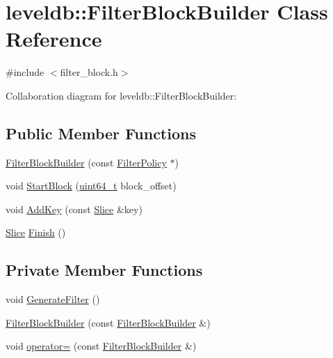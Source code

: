 \hypertarget{classleveldb_1_1_filter_block_builder}{\section{leveldb\-:\-:Filter\-Block\-Builder Class Reference}
\label{classleveldb_1_1_filter_block_builder}
}


{\ttfamily \#include $<$filter\-\_\-block.\-h$>$}



Collaboration diagram for leveldb\-:\-:Filter\-Block\-Builder\-:
\subsection*{Public Member Functions}
\begin{DoxyCompactItemize}
\item 
\hyperlink{classleveldb_1_1_filter_block_builder_a8e8b5ae95df5a13c035bec85e22549ca}{Filter\-Block\-Builder} (const \hyperlink{classleveldb_1_1_filter_policy}{Filter\-Policy} $\ast$)
\item 
void \hyperlink{classleveldb_1_1_filter_block_builder_a766a753a200f7386196a68897e47c1c3}{Start\-Block} (\hyperlink{stdint_8h_aaa5d1cd013383c889537491c3cfd9aad}{uint64\-\_\-t} block\-\_\-offset)
\item 
void \hyperlink{classleveldb_1_1_filter_block_builder_a4fd9db735c5c72973cec62e4fd98137d}{Add\-Key} (const \hyperlink{classleveldb_1_1_slice}{Slice} \&key)
\item 
\hyperlink{classleveldb_1_1_slice}{Slice} \hyperlink{classleveldb_1_1_filter_block_builder_a75fa127d8af42e749abdd235eed97cad}{Finish} ()
\end{DoxyCompactItemize}
\subsection*{Private Member Functions}
\begin{DoxyCompactItemize}
\item 
void \hyperlink{classleveldb_1_1_filter_block_builder_ab9141e1d64c8dc779a5fc9eae390407a}{Generate\-Filter} ()
\item 
\hyperlink{classleveldb_1_1_filter_block_builder_a5f999cf28b5cc91c8a79f64b40a7ff1a}{Filter\-Block\-Builder} (const \hyperlink{classleveldb_1_1_filter_block_builder}{Filter\-Block\-Builder} \&)
\item 
void \hyperlink{classleveldb_1_1_filter_block_builder_a14f852d72d7ebde56e0827f619ce796d}{operator=} (const \hyperlink{classleveldb_1_1_filter_block_builder}{Filter\-Block\-Builder} \&)
\end{DoxyCompactItemize}
